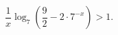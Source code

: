 \begin{ex}[type=inequality]
	\begin{condition}
		$\dfrac{1}{x}\log_7 \left(\dfrac{9}{2} - 2\cdot7^{-x}\right) > 1  .$
	\end{condition}
\end{ex}